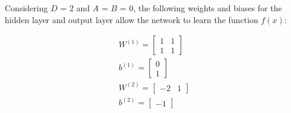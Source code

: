\documentclass[12pt]{article}
\begin{document}
\begin{enumerate}[leftmargin=\labelsep]
\begin{enumerate}[label=\alph*)]
                    \vspace{12pt}

                    Considering $D$ = 2 and $A$ = $B$ = 0, the following weights and biases for the hidden layer and output layer allow the network to learn the function $f(x)$:

                    \begin{equation}
                        \begin{gathered}
                            W^{(1)} = \begin{bmatrix}
                                1 & 1 \\
                                1 & 1
                            \end{bmatrix} \\
                            b^{(1)} = \begin{bmatrix}
                                0 \\
                                1
                            \end{bmatrix}                                     \\
                            W^{(2)} = \begin{bmatrix}
                                -2 & 1
                            \end{bmatrix} \\
                            b^{(2)} = \begin{bmatrix}
                                -1
                            \end{bmatrix}
                        \end{gathered}
                    \end{equation}

          \end{enumerate}
\end{enumerate}
\end{document}
